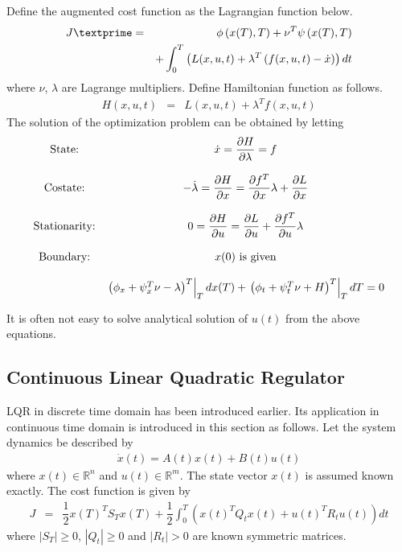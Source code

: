 Define the augmented cost function as the Lagrangian function below.
\begin{eqnarray}
	J\textprime &=& \phi\left(x(T),T\right) + \nu^T\psi\left(x(T),T\right) \nonumber \\
	&& + \int_{0}^{T}\left(L(x, u, t) + \lambda^T\left(f(x, u, t) - \dot{x}\right)\right)dt \nonumber
\end{eqnarray}
where $\nu$, $\lambda$ are Lagrange multipliers. Define Hamiltonian function as follows.
\begin{eqnarray}
	H(x,u,t) &=& L(x, u, t) + \lambda^Tf(x, u, t) \nonumber
\end{eqnarray}
The solution of the optimization problem can be obtained by letting
\begin{eqnarray}
	\begin{array}{cc}
		\textup{State:} & \dot{x} = \dfrac{\partial H}{\partial \lambda} = f \\ & \\
		\textup{Costate:} & -\dot{\lambda} = \dfrac{\partial H}{\partial x} = \dfrac{\partial f^T}{\partial x}\lambda + \dfrac{\partial L}{\partial x} \\ & \\
		\textup{Stationarity:} & 0 = \dfrac{\partial H}{\partial u} = \dfrac{\partial L}{\partial u} + \dfrac{\partial f^T}{\partial u}\lambda \\ & \\
		\textup{Boundary:} & x(0)\textup{~is given} \\ & \\
		& \left.\left(\phi_x+\psi_x^T\nu-\lambda\right)^T\right|_{T}dx(T) + \left.\left(\phi_t+\psi_t^T\nu+H\right)^T\right|_{T}dT = 0
	\end{array} \nonumber
\end{eqnarray}

It is often not easy to solve analytical solution of $u(t)$ from the above equations.

\subsection{Continuous Linear Quadratic Regulator}

LQR in discrete time domain has been introduced earlier. Its application in continuous time domain is introduced in this section as follows. Let the system dynamics be described by
\begin{eqnarray}
	\dot{x}(t) = A(t)x(t) + B(t)u(t) \nonumber
\end{eqnarray}
where $x(t)\in\mathbb{R}^n$ and $u(t)\in\mathbb{R}^m$. The state vector $x(t)$ is assumed known exactly. The cost function is given by
\begin{eqnarray}
  J &=& \dfrac{1}{2}x(T)^TS_Tx(T) + \dfrac{1}{2}\int_{0}^{T}\left(x(t)^TQ_tx(t) + u(t)^TR_tu(t)\right)dt \nonumber
\end{eqnarray}
where $|S_T|\geq 0$, $|Q_t| \geq 0$ and $|R_t| >0$ are known symmetric matrices.

